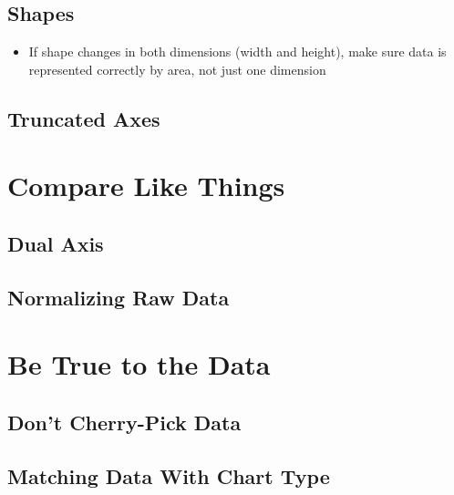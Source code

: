 \documentclass[
]{krantz}
\providecommand{\tightlist}{%
  \setlength{\itemsep}{0pt}\setlength{\parskip}{0pt}}
\begin{document}
\hypertarget{shapes}{%
\subsection{Shapes}\label{shapes}}

\begin{itemize}
\tightlist
\item
  If shape changes in both dimensions (width and height), make sure data is
  represented correctly by area, not just one dimension
\end{itemize}

\hypertarget{truncated-axes}{%
\subsection{Truncated Axes}\label{truncated-axes}}

\hypertarget{compare-like-things}{%
\section{Compare Like Things}\label{compare-like-things}}

\hypertarget{dual-axis}{%
\subsection{Dual Axis}\label{dual-axis}}

\hypertarget{normalizing-raw-data}{%
\subsection{Normalizing Raw Data}\label{normalizing-raw-data}}

\hypertarget{be-true-to-the-data}{%
\section{Be True to the Data}\label{be-true-to-the-data}}

\hypertarget{dont-cherry-pick-data}{%
\subsection{Don't Cherry-Pick Data}\label{dont-cherry-pick-data}}

\hypertarget{matching-data-with-chart-type}{%
\subsection{Matching Data With Chart Type}\label{matching-data-with-chart-type}}
\end{document}
